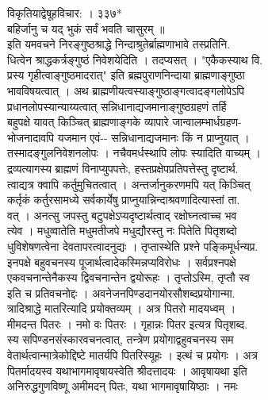 \documentclass[11pt, openany]{book}
\begin{document}
{{{{{{{{{{{{{{{{{{{{{{{{{{{{{{{{{{{{{{{{{{{{{{{{{{{{{{{{{{{ विकृतियाद्वेषूहविचार: । ३३७*\\
बहिर्जानु च यद् भुकं सर्वं भवति चासुरम् ॥\\
इति यमवचने निरङ्गुष्ठश्राद्धे निन्दाश्रुतेर्ब्राह्मणाभावे तस्प्रतिनि.\\
धित्वेन श्राद्धकर्त्रङ्गुष्ठं निवेशयेदिति । तदप्यसत् । "एकैकस्याथ वि.\\
प्रस्य गृहीत्वाङ्गुष्ठमादरात्" इति ब्रह्मपुराणनिन्दाया
ब्राह्मणाङ्गुष्ठा\\
भावविषयत्वात् । अथ ब्राह्मणीयत्वस्याङ्गुष्ठाङ्गत्वादङ्गलोपेऽपि\\
प्रधानलोपस्यान्याय्यत्वात् सन्निधानाद्यजमानाङ्गुष्ठग्रहणं तर्हि\\
बहुपक्षे यावत् किञ्चित् ब्राह्मणाङ्गके व्यापारे जान्वालम्भार्धग्रहण-\\
भोजनादावपि यजमान एवं-\/- सन्निधानाद्यजमानः किं न प्राप्नुयात् ।\\
तस्मादङ्गुलनिवेशनलोपः । नचैवमर्धस्थापि लोपः स्यादिति वाच्यम् ।\\
द्रव्यत्यागस्य ब्राह्मणं विनाप्युपपत्तेः, हस्तप्रक्षेपप्रतिपत्तेस्तु
दृष्टार्थ.\\
त्वाद्यत्र क्वापि कर्तुमुचितत्वात् । अन्तर्जानुकरणमपि यत् किञ्चित्\\
कर्तृकं कर्तुरसामध्ये सर्वकार्येषु प्राप्नुयान्निन्दाश्रवणादित्यास्तां
ता.\\
वत् । अनत्सु जपस्तु बटुपक्षेऽप्यदृष्टार्थत्वाद् रक्षोघ्नत्वाच्च भव\\
त्येव । मधुव्वातेति मधुमतीजपे मधुद्यौरस्तु नः पितेति पितृशब्दो\\
धुविशेषणत्वेना देवतापरत्वादनुद्यः । तृप्तास्थेति प्रश्ने
पङ्किमूर्धन्यप्र.\\
इनपक्षे बहुवचनस्य पूजार्थत्वादेकस्मिन्नप्यविरोधः । सर्वप्रश्नपक्षे\\
एकवचनान्तेनैकस्य द्विवचनान्तेन द्वयोरूहः । तृप्तोऽस्मि, तृप्तौ स्व\\
इति च प्रतिवचनोद्दः । अवनेजनपिण्डदानयोरसौशब्दप्रयोगान्मा.\\
त्रादिश्राद्धे मातरित्यादि प्रयोक्तव्यम् । अत्र पितरो मादयध्वम् ।\\
मीमदन्त पितरः । नमो वः पितरः । गृहान्नः पितर इत्यत्र पितृशब्द.\\
स्य सपिण्डनसंस्कारवचनत्वात्, तन्त्रेण प्रयोगाद्वहुवचनस्य सम\\
वेतार्थत्वान्मात्रेकोद्दिष्टे मातर्यपि पितरिस्यूहः । इत्थं च प्रयोगः ।
अत्र\\
पितर्मादयस्व यथाभागमावृषायस्वेति श्रीदत्तादयः । आवृषायथा इति\\
अनिरुद्धगुणविष्णू \textbar{} अमीमदन् पितः, यथा भागमावृषायिष्ठाः । नमः\\
}}}}}}}}}}}}}}}}}}}}}}}}}}}}}}}}}}}}}}}}}}}}}}}}}}}}}}}}}}}
\end{document}
